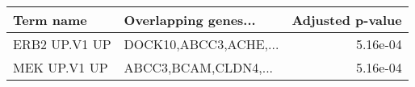 \begin{tabular}{llr}
\toprule
    Term name &  Overlapping genes... &  Adjusted p-value \\
\midrule
ERB2 UP.V1 UP & DOCK10,ABCC3,ACHE,... &          5.16e-04 \\
 MEK UP.V1 UP &  ABCC3,BCAM,CLDN4,... &          5.16e-04 \\
\bottomrule
\end{tabular}
